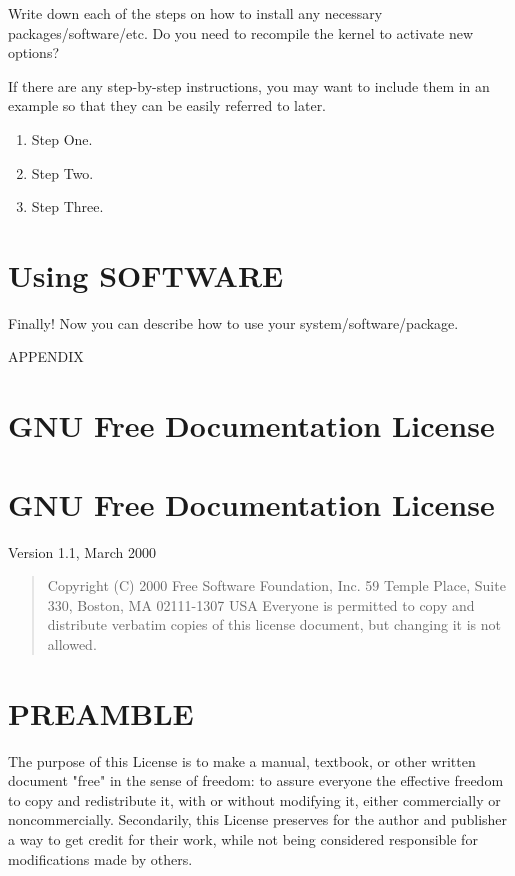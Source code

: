 Write down each of the steps on how to install any necessary
packages/software/etc. Do you need to recompile the kernel to activate
new options?

If there are any step-by-step instructions, you may want to include them
in an example so that they can be easily referred to later.

\begin{enumerate}
\def\labelenumi{\arabic{enumi}.}
\item
  Step One.
\item
  Step Two.
\item
  Step Three.
\end{enumerate}

\section{Using SOFTWARE}\label{using-softwarepackage}

Finally! Now you can describe how to use your system/software/package.

APPENDIX

\section{GNU Free Documentation License}\label{gfdl}

\section{GNU Free Documentation License}

Version 1.1, March 2000

\begin{quote}
Copyright (C) 2000 Free Software Foundation, Inc. 59 Temple Place, Suite
330, Boston, MA 02111-1307 USA Everyone is permitted to copy and
distribute verbatim copies of this license document, but changing it is
not allowed.
\end{quote}

\section{PREAMBLE}\label{gfdl-0}

The purpose of this License is to make a manual, textbook, or other
written document "free" in the sense of freedom: to assure everyone the
effective freedom to copy and redistribute it, with or without modifying
it, either commercially or noncommercially. Secondarily, this License
preserves for the author and publisher a way to get credit for their
work, while not being considered responsible for modifications made by
others.

